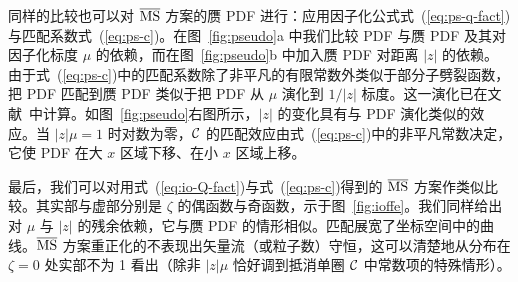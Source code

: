 同样的比较也可以对 $\overline{\rm MS}$ 方案的赝 PDF 进行：应用因子化公式式~(\ref{eq:ps-q-fact})与匹配系数式~(\ref{eq:ps-c})。在图~\ref{fig:pseudo}a 中我们比较 PDF 与赝 PDF 及其对因子化标度 $\mu$ 的依赖，而在图~\ref{fig:pseudo}b 中加入赝 PDF 对距离 $|z|$ 的依赖。由于式~(\ref{eq:ps-c})中的匹配系数除了非平凡的有限常数外类似于部分子劈裂函数，把 PDF 匹配到赝 PDF 类似于把 PDF 从 $\mu$ 演化到 $1/|z|$ 标度。这一演化已在文献~\cite{Radyushkin:2017cyf}中计算。如图~\ref{fig:pseudo}右图所示，$|z|$ 的变化具有与 PDF 演化类似的效应。当 $|z|\mu=1$ 时对数为零，${\cal C}$ 的匹配效应由式~(\ref{eq:ps-c})中的非平凡常数决定，它使 PDF 在大 $x$ 区域下移、在小 $x$ 区域上移。

最后，我们可以对用式~(\ref{eq:io-Q-fact})与式~(\ref{eq:ps-c})得到的 $\overline{\rm MS}$ 方案\spcorr 作类似比较。其实部与虚部分别是 $\zeta$ 的偶函数与奇函数，示于图~\ref{fig:ioffe}。我们同样给出对 $\mu$ 与 $|z|$ 的残余依赖，它与赝 PDF 的情形相似。匹配展宽了坐标空间中的曲线。$\overline{\rm MS}$ 方案重正化的\spcorr 不表现出矢量流（或粒子数）守恒，这可以清楚地从分布在 $\zeta=0$ 处实部不为 1 看出（除非 $|z|\mu$ 恰好调到抵消单圈 ${\cal C}$ 中常数项的特殊情形）。

